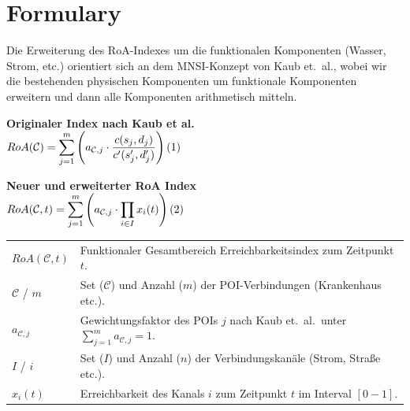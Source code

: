 \section{Formulary}
\label{sec:formulary}

Die Erweiterung des RoA-Indexes um die funktionalen Komponenten (Wasser, Strom, etc.) orientiert sich an dem MNSI-Konzept von Kaub et. al., wobei wir die bestehenden physischen Komponenten um funktionale Komponenten erweitern und dann alle Komponenten arithmetisch mitteln.

\vspace{2mm}

\noindent
\begin{minipage}[t]{0.48\textwidth}
    \centering
    \small
    \textbf{Originaler Index nach Kaub et al.} \\[2mm]
    $\displaystyle RoA(\mathcal{C}) = \sum_{j=1}^{m} \left( a_{\mathcal{C},j} \cdot \frac{c(s_{j},d_{j})}{c^{\prime}(s_{j}^{\prime},d_{j}^{\prime})} \right) \refstepcounter{equation}(\theequation)$
\end{minipage}%
\hfill
\begin{minipage}[t]{0.48\textwidth}
    \centering
    \small
    \textbf{Neuer und erweiterter RoA Index} \\[2mm]
    $\displaystyle RoA(\mathcal{C}, t) = \sum_{j=1}^{m} \left( a_{\mathcal{C},j} \cdot \prod_{i \in I} x_i(t) \right) \refstepcounter{equation}(\theequation)$
\end{minipage}

\vspace{2mm}

\noindent
\begin{tabularx}{\textwidth}{@{}l X@{}}
    $RoA(\mathcal{C}, t)$ & Funktionaler Gesamtbereich Erreichbarkeitsindex zum Zeitpunkt $t$. \\
    $\mathcal{C}$ / $m$ & Set ($\mathcal{C}$) und Anzahl ($m$) der POI-Verbindungen (Krankenhaus etc.). \\
    $a_{\mathcal{C},j}$ & Gewichtungsfaktor des POIs $j$ nach Kaub et. al.\ unter $\sum_{j=1}^{m} a_{\mathcal{C},j} = 1$. \\
    $I$ / $i$ & Set ($I$) und Anzahl ($n$) der Verbindungskanäle (Strom, Straße etc.). \\
    $x_i(t)$ & Erreichbarkeit des Kanals $i$ zum Zeitpunkt $t$ im Interval $[0-1]$. \\

\end{tabularx}

\vspace{7mm}

